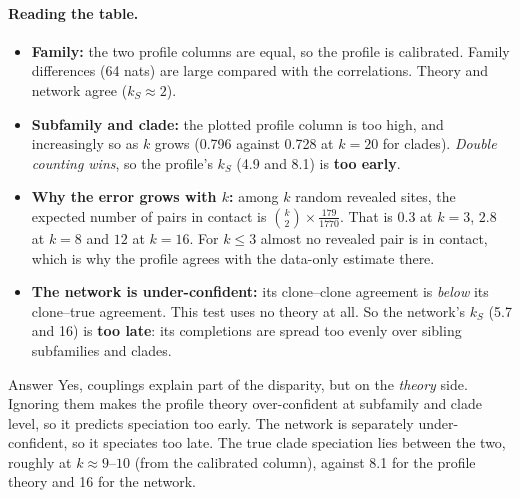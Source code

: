 \documentclass[11pt,a4paper]{article}
\begin{document}
\paragraph{Reading the table.}
\begin{itemize}[nosep]
\item \textbf{Family:} the two profile columns are equal, so the profile is calibrated. Family differences (64 nats) are
large compared with the correlations. Theory and network agree ($k_S\approx2$).
\item \textbf{Subfamily and clade:} the plotted profile column is too high, and increasingly so as $k$ grows (0.796
against 0.728 at $k=20$ for clades). \emph{Double counting wins}, so the profile's $k_S$ (4.9 and 8.1) is \textbf{too
early}.
\item \textbf{Why the error grows with $k$:} among $k$ random revealed sites, the expected number of pairs in contact is
$\binom k2\times\frac{179}{1770}$. That is $0.3$ at $k=3$, $2.8$ at $k=8$ and $12$ at $k=16$. For $k\le3$ almost no revealed
pair is in contact, which is why the profile agrees with the data-only estimate there.
\item \textbf{The network is under-confident:} its clone--clone agreement is \emph{below} its clone--true agreement. This
test uses no theory at all. So the network's $k_S$ (5.7 and 16) is \textbf{too late}: its completions are spread too
evenly over sibling subfamilies and clades.
\end{itemize}

\begin{keybox}{Answer}
Yes, couplings explain part of the disparity, but on the \emph{theory} side. Ignoring them makes the profile
theory over-confident at subfamily and clade level, so it predicts speciation too early. The network is separately
under-confident, so it speciates too late. The true clade speciation lies between the two, roughly at $k\approx9$--$10$
(from the calibrated column), against 8.1 for the profile theory and 16 for the network.
\end{keybox}
\end{document}
